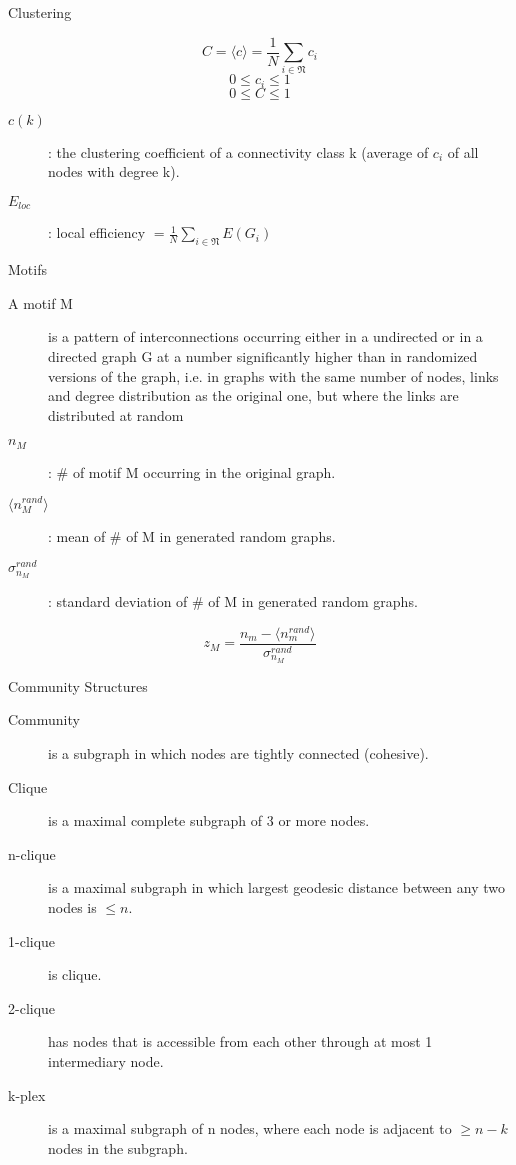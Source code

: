 \documentclass{beamer}
\begin{document}

\begin{frame}{Clustering}

\[ C = \langle c \rangle = \frac{1}{N} \sum_{i \in \mathfrak{N}} c_i \]
\[ 0 \leq c_i \leq 1\]
\[ 0 \leq C \leq 1 \]
\begin{description}
 \item [$c(k)$]: the clustering coefficient of a connectivity class k (average of $c_i$ of all nodes with degree k).
 \item [$E_{loc}$]: local efficiency $= \frac{1}{N} \sum_{i \in \mathfrak{N}} E(G_i)$
\end{description}
 

\end{frame}


\begin{frame}{Motifs}

\begin{description}
 \item [A motif M] is a pattern of interconnections occurring either in a undirected or in a directed graph G at a number significantly higher than in randomized versions of the graph, i.e. in graphs with the same number of nodes, links and degree distribution as the original one, but where the links are distributed at random
 \item [$n_M$]: \# of motif M occurring in the original graph.
 \item [$\langle n_M^{rand} \rangle$]: mean of \# of M in generated random graphs.
 \item [$\sigma_{n_M}^{rand}$]: standard deviation of \# of M in generated random graphs.
\end{description}

\[z_M = \frac{n_m - \langle n_m^{rand} \rangle}{\sigma_{n_M}^{rand}} \]



\end{frame}


\begin{frame}{Community Structures}

\begin{description}
 \item [Community] is a subgraph in which nodes are tightly connected (cohesive).
 \item [Clique] is a maximal complete subgraph of 3 or more nodes.
 \item [n-clique] is a maximal subgraph in which largest geodesic distance between any two nodes is $\leq n$.
 \item [1-clique] is clique.
 \item [2-clique] has nodes that is accessible from each other through at most 1 intermediary node.
 \item [k-plex] is a maximal subgraph of n nodes, where each node is adjacent to $\geq n-k$ nodes in the subgraph.
\end{description}

\end{frame}
\end{document}
